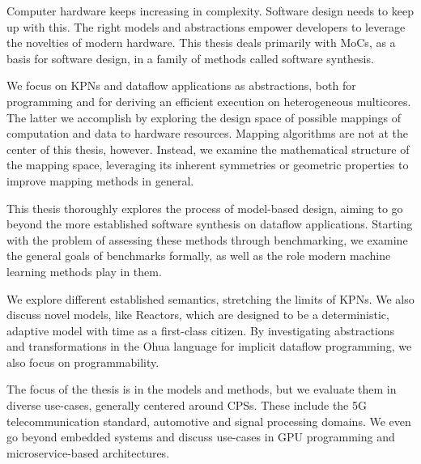Computer hardware keeps increasing in complexity.
Software design needs to keep up with this.
The right models and abstractions empower developers to leverage the novelties of modern hardware.
This thesis deals primarily with \aclp*{MoC}, as a basis for software design, in a family of methods called software synthesis.

We focus on \aclp*{KPN} and dataflow applications as abstractions, both for programming and for deriving an efficient execution on heterogeneous multicores.
The latter we accomplish by exploring the design space of possible mappings of computation and data to hardware resources.
Mapping algorithms are not at the center of this thesis, however.
Instead, we examine the mathematical structure of the mapping space, leveraging its inherent symmetries or geometric properties to improve mapping methods in general.

This thesis thoroughly explores the process of model-based design, aiming to go beyond the more established software synthesis on dataflow applications.
Starting with the problem of assessing these methods through benchmarking, we examine the general goals of benchmarks formally, as well as the role modern machine learning methods play in them.

We explore different established semantics, stretching the limits of \aclp*{KPN}.
We also discuss novel models, like Reactors, which are designed to be a deterministic, adaptive model with time as a first-class citizen.
By investigating abstractions and transformations in the Ohua language for implicit dataflow programming, we also focus on programmability.

The focus of the thesis is in the models and methods, but we evaluate them in diverse use-cases, generally centered around \aclp*{CPS}.
These include the 5G telecommunication standard, automotive and signal processing domains.
We even go beyond embedded systems and discuss use-cases in \acs*{GPU} programming and microservice-based architectures.